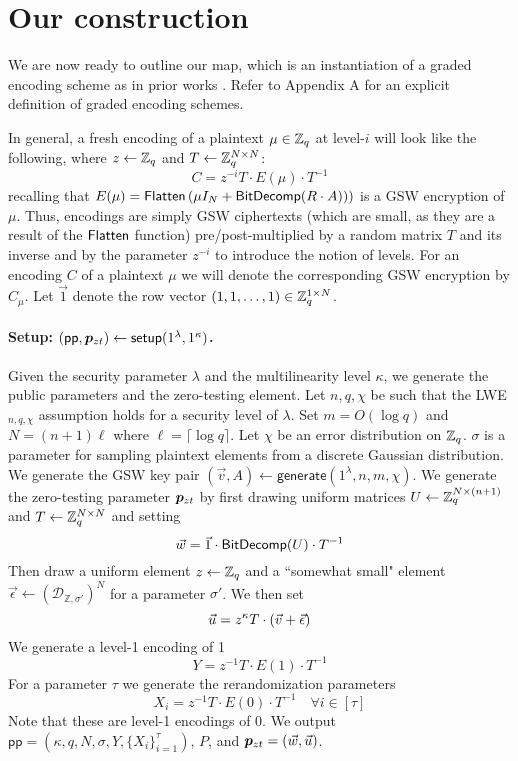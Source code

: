 \section{Our construction}

We are now ready to outline our map, which is an instantiation of a graded encoding scheme as in prior works \cite{clt, ggh13a, ggh14a, clt15}.  Refer to Appendix A for an explicit definition of graded encoding schemes. 

In general, a fresh encoding of a plaintext $\mu \in \mathbb{Z}_q$ at level-$i$ will look like the following, where $z \leftarrow \mathbb{Z}_q$ and $T\leftarrow \mathbb{Z}_q^{N \times N}$:
$$C = z^{-i}T \cdot E(\mu)\cdot T^{-1}$$
recalling that $E(\mu) = \mathsf{Flatten}\left(\mu I_{N} + \mathsf{BitDecomp}(R\cdot A))\right)$ is a GSW encryption of $\mu$. Thus, encodings are simply GSW ciphertexts (which are small, as they are a result of the $\mathsf{Flatten}$ function) pre/post-multiplied by a random matrix $T$ and its inverse and by the parameter $z^{-i}$ to introduce the notion of levels.  For an encoding $C$ of a plaintext $\mu$ we will denote the corresponding GSW encryption by $C_\mu$.  Let $\vec{1}$ denote the row vector $(1,1,\ldots, 1) \in \mathbb{Z}_q^{1 \times N}$.

\paragraph{Setup: $(\mathsf{pp},\bm{p}_{zt}) \leftarrow \mathsf{setup}(1^\lambda, 1^\kappa)$.}  Given the security parameter $\lambda$ and the multilinearity level $\kappa$, we generate the public parameters and the zero-testing element.  Let $n,q, \chi$ be such that the LWE$_{n,q,\chi}$ assumption holds for a security level of $\lambda$.  Set $m = O(\log q)$ and $N = (n+1)\ell$ where $\ell = \lceil \log q \rceil$.  Let $\chi$ be an error distribution on $\mathbb{Z}_q$.  $\sigma$ is a parameter for sampling plaintext elements from a discrete Gaussian distribution.  We generate the GSW key pair $(\vec{v},A) \leftarrow \mathsf{generate}(1^\lambda,n,m, \chi)$.  We generate the zero-testing parameter $\bm{p}_{zt}$ by first drawing uniform matrices $U \leftarrow \mathbb{Z}_q^{N\times (n+1)}$ and $T \leftarrow \mathbb{Z}_q^{N \times N}$ and setting $$\vec{w} = \vec{1}\cdot \mathsf{BitDecomp}(U)\cdot T^{-1}$$  Then draw a uniform element $z \leftarrow \mathbb{Z}_q$ and a ``somewhat small" element $\vec{\epsilon} \leftarrow (\mathcal{D}_{\mathbb{Z}, \sigma'})^N$ for a parameter $\sigma'$.  We then set $$\vec{u} = z^\kappa T\cdot (\vec{v} + \vec{\epsilon})$$  We generate a level-1 encoding of 1 $$Y = z^{-1}T\cdot E(1) \cdot T^{-1}$$  For a parameter $\tau$ we generate the rerandomization parameters $$X_i = z^{-1}T\cdot E(0) \cdot T^{-1} \quad \forall i \in [\tau]$$  Note that these are level-1 encodings of 0. We output $\mathsf{pp} = (\kappa, q,N,\sigma, Y, \{X_i\}_{i=1}^\tau)$, $P$, and $\bm{p}_{zt} = (\vec{w},\vec{u})$.

